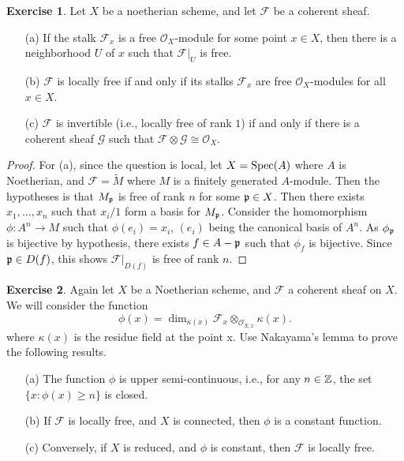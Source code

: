 \documentclass[11pt]{book}
\theoremstyle{definition}
\newtheorem{exercise}{Exercise}[section]
\begin{document}
\begin{exercise}
Let $X$ be a noetherian scheme, and let $\mathscr{F}$ be a coherent sheaf.
\begin{itemize}
\item[(a)] If the stalk $\mathscr{F}_x$ is a free $\mathscr{O}_X$-module for some point $x\in X$, then there is a neighborhood $U$ of $x$ such that $\mathscr{F}|_U$ is free.
\item[(b)] $\mathscr{F}$ is locally free if and only if its stalks $\mathscr{F}_x$ are free $\mathscr{O}_X$-modules for all $x\in X$.
\item[(c)] $\mathscr{F}$ is invertible (i.e., locally free of rank $1$) if and only if there is a coherent sheaf $\mathscr{G}$ such that $\mathscr{F}\otimes\mathscr{G}\cong\mathscr{O}_X$.
\end{itemize}
\end{exercise}
\begin{proof}
For (a), since the question is local, let $X=\mathrm{Spec}(A)$ where $A$ is Noetherian, and $\mathscr{F}=\widetilde{M}$ where $M$ is a finitely generated $A$-module. Then the hypotheses is that $M_{\mathfrak{p}}$ is free of rank $n$ for some $\mathfrak{p}\in X$. Then there exists $x_1,\dots,x_n$ such that $x_i/1$ form a basis for $M_{\mathfrak{p}}$. Consider the homomorphism $\phi:A^n\to M$ such that $\phi(e_i)=x_i$, $(e_i)$ being the canonical basis of $A^n$. As $\phi_{\mathfrak{p}}$ is bijective by hypothesis, there exists $f\in A-\mathfrak{p}$ such that $\phi_f$ is bijective. Since $\mathfrak{p}\in D(f)$, this shows $\mathscr{F}|_{D(f)}$ is free of rank $n$. 
\end{proof}
\begin{exercise}
Again let $X$ be a Noetherian scheme, and $\mathscr{F}$ a coherent sheaf on $X$. We will consider the function
\[\phi(x)=\dim_{\kappa(x)}\mathscr{F}_x\otimes_{\mathscr{O}_{X,x}}\kappa(x).\]
where $\kappa(x)$ is the residue field at the point x. Use Nakayama's lemma to prove the following results.
\begin{itemize}
\item[(a)] The function $\phi$ is upper semi-continuous, i.e., for any $n\in\mathbb{Z}$, the set $\{x:\phi(x)\geq n\}$ is closed.
\item[(b)] If $\mathscr{F}$ is locally free, and $X$ is connected, then $\phi$ is a constant function.
\item[(c)] Conversely, if $X$ is reduced, and $\phi$ is constant, then $\mathscr{F}$ is locally free.
\end{itemize}
\end{exercise}
\end{document}
